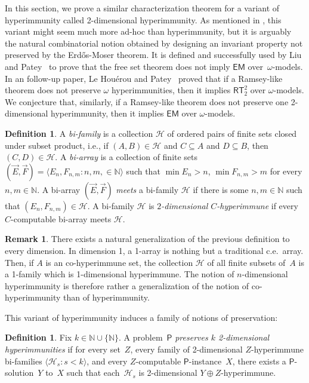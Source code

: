 \documentclass{article}
\newcommand{\Psf}{\mathsf{P}}
\def\Hc{\mathcal{H}}
\newcommand{\EM}[0]{\mathsf{EM}}
\newcommand{\RT}[0]{\mathsf{RT}}
\newcommand{\NN}[0]{\mathbb{N}}
\def\NN{\mathbb{N}}
\def\Hc{\mathcal{H}}
\numberwithin{theorem}{section}
\theoremstyle{definition}
\newtheorem{definition}[theorem]{Definition}
\newtheorem{remark}[theorem]{Remark}
\begin{document}
In this section, we prove a similar characterization theorem for a variant of hyperimmunity called 2-dimensional hyperimmunity.
As mentioned in , this variant might seem much more ad-hoc than hyperimmunity, but it is arguably the natural combinatorial notion obtained by designing an invariant property not preserved by the Erd\H{o}s-Moser theorem. It is defined and  successfully used by Liu and Patey~\cite{liu2022reverse} to prove that the free set theorem does not imply $\EM$ over~$\omega$-models.
In an follow-up paper, Le Houérou and Patey~\cite{houerou2025ramseylike} proved that if a Ramsey-like theorem does not preserve $\omega$ hyperimmunities, then it implies $\RT^2_2$ over $\omega$-models. We conjecture that, similarly, if a Ramsey-like theorem does not preserve one 2-dimensional hyperimmunity, then it implies $\EM$ over $\omega$-models.

\begin{definition}
    A \emph{bi-family} is a collection $\Hc$ of ordered pairs of finite sets closed under subset product, i.e., if $(A, B) \in \Hc$ and $C \subseteq A$ and $D \subseteq B$, then $(C,D) \in \Hc$.
    A \emph{bi-array} is a collection of finite sets $(\vec{E}, \vec{F}) = \langle E_n, F_{n,m} : n,m, \in \NN \rangle$ such that $\min E_n > n$, $\min F_{n,m} > m$ for every $n,m \in \NN$. A bi-array $(\vec{E}, \vec{F})$ \emph{meets} a bi-family $\Hc$ if there is some $n,m \in \NN$ such that $(E_n, F_{n,m}) \in \Hc$.
    A bi-family $\Hc$ is \emph{$2$-dimensional $C$-hyperimmune} if every $C$-computable bi-array meets $\Hc$.
\end{definition}

\begin{remark}
There exists a natural generalization of the previous definition to every dimension. In dimension 1, a 1-array is nothing but a traditional c.e.\ array. Then, if $A$ is an co-hyperimmune set, the collection $\Hc$ of all finite subsets of~$A$ is a 1-family which is 1-dimensional hyperimmune. The notion of $n$-dimensional hyperimmunity is therefore rather a generalization of the notion of co-hyperimmunity than of hyperimmunity.
\end{remark}

This variant of hyperimmunity induces a family of notions of preservation:

\begin{definition}
Fix $k \in \NN \cup \{\NN\}$.
A problem~$\Psf$ \emph{preserves $k$ 2-dimensional hyperimmunities} if for every set~$Z$,
every family of 2-dimensional $Z$-hyperimmune bi-families  $\langle \Hc_s : s < k \rangle$, and every $Z$-computable $\Psf$-instance~$X$, there exists a $\Psf$-solution~$Y$ to~$X$ such that each~$\Hc_s$ is 2-dimensional $Y \oplus Z$-hyperimmune.    
\end{definition}
\end{document}
